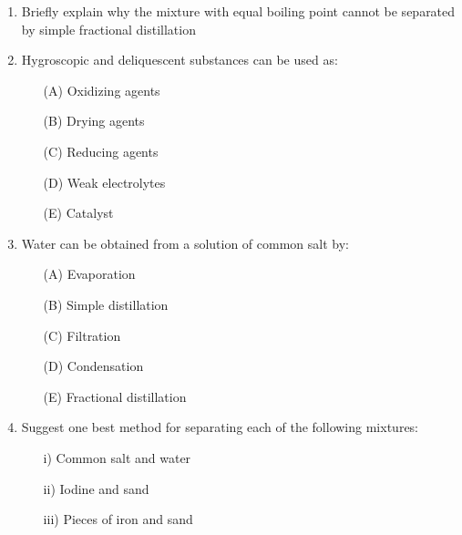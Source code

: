 \begin{enumerate}
	\item Briefly explain why the mixture with equal boiling point cannot be separated by simple fractional distillation
	
	\item Hygroscopic and deliquescent substances can be used as:
	\begin{enumerate}[topsep=0ex,itemsep=0ex,partopsep=1ex,parsep=1ex]
		\item[(A)] Oxidizing agents
		\item[(B)] Drying agents
		\item[(C)] Reducing agents
		\item[(D)] Weak electrolytes
		\item[(E)] Catalyst
	\end{enumerate}
	
	\item Water can be obtained from a solution of common salt by:
	\begin{enumerate}[topsep=0ex,itemsep=0ex,partopsep=1ex,parsep=1ex]
		\item[(A)] Evaporation
		\item[(B)] Simple distillation
		\item[(C)] Filtration
		\item[(D)] Condensation
		\item[(E)] Fractional distillation
	\end{enumerate}
	
	\item Suggest one best method for separating each of the following mixtures:
	\begin{enumerate}[topsep=0ex,itemsep=0ex,partopsep=1ex,parsep=1ex]
		\item[i)] Common salt and water
		\item[ii)] Iodine and sand
		\item[iii)] Pieces of iron and sand
	\end{enumerate}
\end{enumerate}

















